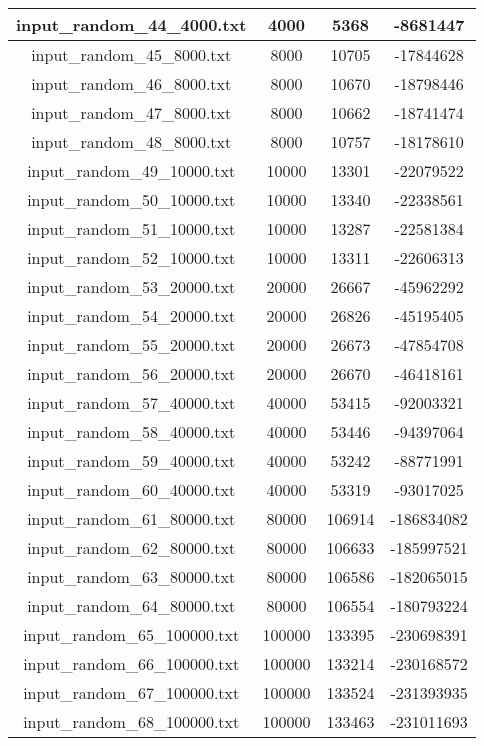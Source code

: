 \begin{longtable}{|c|c|c|c|}
		 \\ \hline
		input\_random\_44\_4000.txt & 4000 & 5368 & -8681447
		 \\ \hline
		input\_random\_45\_8000.txt & 8000 & 10705 & -17844628
		 \\ \hline
		input\_random\_46\_8000.txt & 8000 & 10670 & -18798446
		 \\ \hline
		input\_random\_47\_8000.txt & 8000 & 10662 & -18741474
		 \\ \hline
		input\_random\_48\_8000.txt & 8000 & 10757 & -18178610
		 \\ \hline
		input\_random\_49\_10000.txt & 10000 & 13301 & -22079522
		 \\ \hline
		input\_random\_50\_10000.txt & 10000 & 13340 & -22338561
		 \\ \hline
		input\_random\_51\_10000.txt & 10000 & 13287 & -22581384
		 \\ \hline
		input\_random\_52\_10000.txt & 10000 & 13311 & -22606313
		 \\ \hline
		input\_random\_53\_20000.txt & 20000 & 26667 & -45962292
		 \\ \hline
		input\_random\_54\_20000.txt & 20000 & 26826 & -45195405
		 \\ \hline
		input\_random\_55\_20000.txt & 20000 & 26673 & -47854708 \\ \hline
		input\_random\_56\_20000.txt & 20000 & 26670 & -46418161
		 \\ \hline
		input\_random\_57\_40000.txt & 40000 & 53415 & -92003321
		 \\ \hline
		input\_random\_58\_40000.txt & 40000 & 53446 & -94397064
		 \\ \hline
		input\_random\_59\_40000.txt & 40000 & 53242 & -88771991
		 \\ \hline
		input\_random\_60\_40000.txt & 40000 & 53319 & -93017025
		 \\ \hline
		input\_random\_61\_80000.txt & 80000 & 106914 & -186834082 \\ \hline
		input\_random\_62\_80000.txt & 80000 & 106633 & -185997521 \\ \hline
		input\_random\_63\_80000.txt & 80000 & 106586 & -182065015
		 \\ \hline
		input\_random\_64\_80000.txt & 80000 & 106554 & -180793224
		 \\ \hline
		input\_random\_65\_100000.txt & 100000 & 133395 & -230698391
		 \\ \hline
		input\_random\_66\_100000.txt & 100000 & 133214 & -230168572
		 \\ \hline
		input\_random\_67\_100000.txt & 100000 & 133524 & -231393935
		 \\ \hline
		input\_random\_68\_100000.txt & 100000 & 133463 & -231011693
		 \\ \hline
	\end{longtable}

